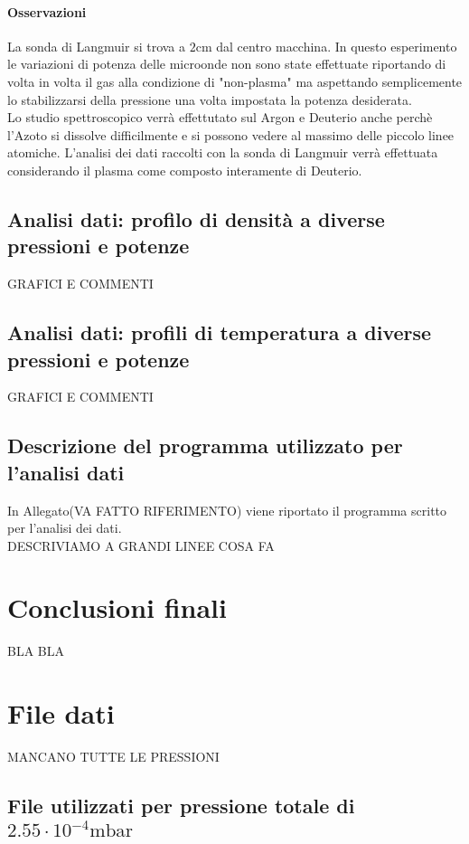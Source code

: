 \paragraph{Osservazioni}
La sonda di Langmuir si trova a $2\si{\centi\meter}$ dal centro macchina.
In questo esperimento le variazioni di potenza delle microonde non sono state effettuate riportando di volta in volta il gas alla condizione di "non-plasma" ma aspettando semplicemente lo stabilizzarsi 
della pressione una volta impostata la potenza desiderata.\\
Lo studio spettroscopico verrà effettutato sul Argon e Deuterio anche perchè l'Azoto si dissolve difficilmente e si possono vedere al massimo delle piccolo linee atomiche. 
L'analisi dei dati raccolti con la sonda di Langmuir verrà effettuata considerando il plasma come composto interamente di Deuterio.

\subsection{Analisi dati: profilo di densità a diverse pressioni e potenze}

GRAFICI E COMMENTI
\subsection{Analisi dati: profili di temperatura a diverse pressioni e potenze}

GRAFICI E COMMENTI

\subsection{Descrizione del programma utilizzato per l'analisi dati}
In Allegato(VA FATTO RIFERIMENTO) viene riportato il programma scritto per l'analisi dei dati.\\
DESCRIVIAMO A GRANDI LINEE COSA FA


\section{Conclusioni finali}
BLA BLA

\section{File dati}
MANCANO TUTTE LE PRESSIONI

\subsection{File utilizzati per pressione totale di $2.55\cdot10^{-4}\si{\milli\bar}$}

